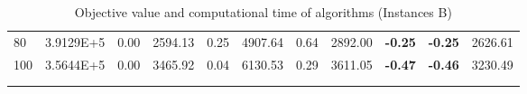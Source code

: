 {\begin{longtable}{@{}llccccccccc@{}}
\multicolumn{1}{l|}{80}  & \multicolumn{1}{l|}{3.9129E+5}  & 0.00 & \multicolumn{1}{c|}{2594.13} & 0.25 & \multicolumn{1}{c|}{4907.64} & 0.64 & \multicolumn{1}{c|}{2892.00} & \textbf{-0.25} & \textbf{-0.25} & 2626.61 \\
\multicolumn{1}{l|}{100} & \multicolumn{1}{l|}{3.5644E+5}  & 0.00 & \multicolumn{1}{c|}{3465.92} & 0.04 & \multicolumn{1}{c|}{6130.53} & 0.29 & \multicolumn{1}{c|}{3611.05} & \textbf{-0.47} & \textbf{-0.46} & 3230.49 \\ \hline
\caption{Objective value and computational time of algorithms (Instances B)}\\
\label{results-all-B}\\
\end{longtable}}